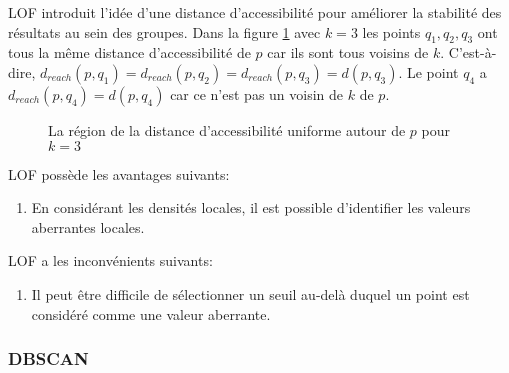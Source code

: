 LOF introduit l'idée d'une distance d'accessibilité pour améliorer la stabilité des résultats au sein des groupes. 
Dans la figure \ref{reachability} avec $k=3$ les points $q_1, q_2, q_3$ ont tous la même distance d'accessibilité de $p$ car ils sont tous voisins de $k$.
C'est-à-dire, 
$
d_{reach}(p, q_1) 
= d_{reach}(p, q_2)
= d_{reach}(p, q_3)
= d(p, q_3)
$.
Le point  $q_4$ a 
$d_{reach}(p, q_4)
= d(p, q_4)
$
car ce n'est pas un voisin de $k$ de $p$.

\begin{figure}[H]
\centering
{}
\caption{La région de la distance d'accessibilité uniforme autour de $p$ pour $k=3$}
\label{reachability}
\end{figure}

LOF possède les avantages suivants:
\begin{enumerate}
\item En considérant les densités locales, il est possible d'identifier les valeurs aberrantes locales.
\end{enumerate}

LOF a les inconvénients suivants:
\begin{enumerate}
\item Il peut être difficile de sélectionner un seuil au-delà duquel un point est considéré comme une valeur aberrante.
\end{enumerate}

\subsubsection*{DBSCAN}

